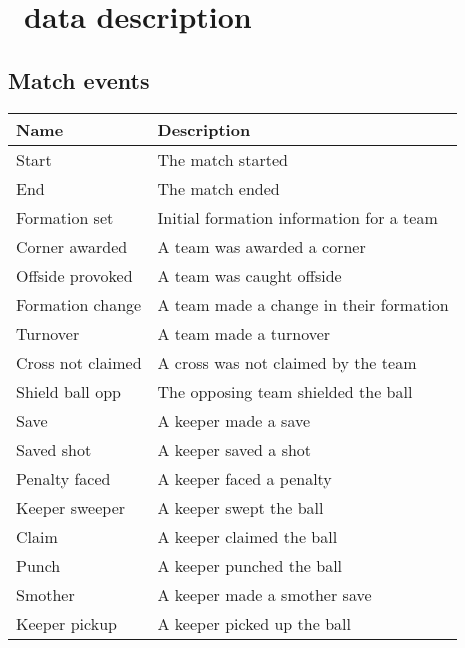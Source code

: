 \chapter{\whoscoredplain\ data description}
\label{chp:whoscored-data-description}


\section{Match events}

\begin{table}[H]
    \centering
    \noindent\begin{tabulary}{\textwidth}{| L | L |}
        \hline
        \textbf{Name}       & \textbf{Description} \\\hline
        Start               & The match started \\\hline
        End                 & The match ended \\\hline
        Formation set       & Initial formation information for a team \\\hline
        
        Corner awarded      & A team was awarded a corner \\\hline
        Offside provoked    & A team was caught offside \\\hline
        Formation change    & A team made a change in their formation \\\hline
        Turnover            & A team made a turnover \\\hline
        Cross not claimed   & A cross was not claimed by the team \\\hline
        Shield ball opp     & The opposing team shielded the ball \\\hline
        
        Save                & A keeper made a save \\\hline
        Saved shot          & A keeper saved a shot \\\hline
        Penalty faced       & A keeper faced a penalty \\\hline
        Keeper sweeper      & A keeper swept the ball \\\hline
        Claim               & A keeper claimed the ball \\\hline
        Punch               & A keeper punched the ball \\\hline
        Smother             & A keeper made a smother save \\\hline
        Keeper pickup       & A keeper picked up the ball \\\hline
        

\end{tabulary}
\end{table}
